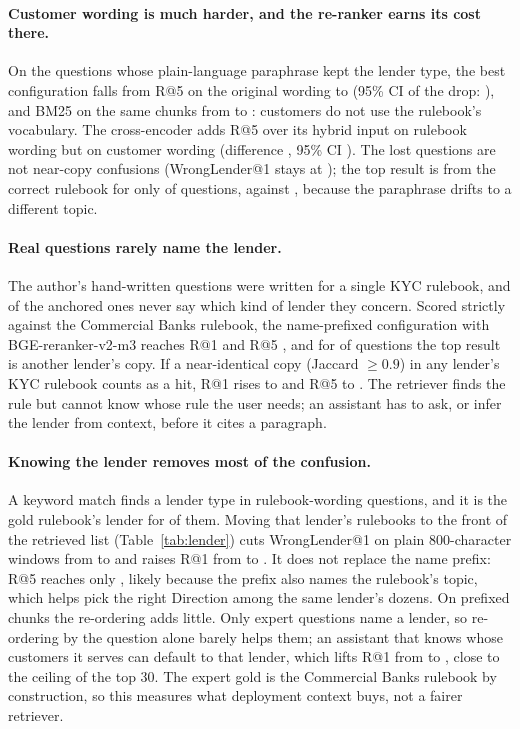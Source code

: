 \documentclass[11pt]{article}
\begin{document}
\paragraph{Customer wording is much harder, and the re-ranker earns its cost there.} On the \NCust{} questions whose plain-language paraphrase kept the lender type, the best configuration falls from R@5 \CustOffRfive{} on the original wording to \CustRfive{} (95\% CI of the drop: \CICustRfive{}), and BM25 on the same chunks from \CustBMOff{} to \CustBM{}: customers do not use the rulebook's vocabulary. The cross-encoder adds \OffRerankGain{} R@5 over its hybrid input on rulebook wording but \CustRerankGain{} on customer wording (difference \RerankDiff{}, 95\% CI \CIRerankDiff{}). The lost questions are not near-copy confusions (WrongLender@1 stays at \CustWL{}); the top result is from the correct rulebook for only \CustBook{} of questions, against \CustOffBook{}, because the paraphrase drifts to a different topic.

\paragraph{Real questions rarely name the lender.} The author's hand-written questions were written for a single KYC rulebook, and \NExpertUnnamed{} of the \NExpertQ{} anchored ones never say which kind of lender they concern. Scored strictly against the Commercial Banks rulebook, the name-prefixed configuration with BGE-reranker-v2-m3 reaches R@1 \ExpertRone{} and R@5 \ExpertRfive{}, and for \ExpertWL{} of questions the top result is another lender's copy. If a near-identical copy (Jaccard $\geq0.9$) in any lender's KYC rulebook counts as a hit, R@1 rises to \ExpertAnyRone{} and R@5 to \ExpertAnyRfive{}. The retriever finds the rule but cannot know whose rule the user needs; an assistant has to ask, or infer the lender from context, before it cites a paragraph.



\paragraph{Knowing the lender removes most of the confusion.} A keyword match finds a lender type in \LANamed{} rulebook-wording questions, and it is the gold rulebook's lender for \LAPrec{} of them. Moving that lender's rulebooks to the front of the retrieved list (Table~\ref{tab:lender}) cuts WrongLender@1 on plain 800-character windows from \LAFixedWL{} to \LAFixedWLp{} and raises R@1 from \LAFixedRone{} to \LAFixedRonep{}. It does not replace the name prefix: R@5 reaches only \LAFixedRfivep{}, likely because the prefix also names the rulebook's topic, which helps pick the right Direction among the same lender's dozens. On prefixed chunks the re-ordering adds little. Only \LAExpertNamed{} expert questions name a lender, so re-ordering by the question alone barely helps them; an assistant that knows whose customers it serves can default to that lender, which lifts R@1 from \ExpertRone{} to \LAExpertRone{}, close to the \LAExpertRthirty{} ceiling of the top 30. The expert gold is the Commercial Banks rulebook by construction, so this measures what deployment context buys, not a fairer retriever.
\end{document}
